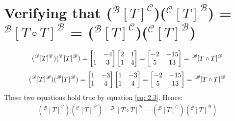 \documentclass[reqno,a4paper,12pt]{amsart}
\newcommand{\C}{\mathscr{C}}
\newcommand{\B}{\mathscr{B}}
\numberwithin{equation}{section}
\begin{document}
  \section{Verifying that ($^\B[T]^\C$)($^\C[T]^\B$) = $^\B[T \circ T]^\B$ = ($^\B[T]^\C$)($^\C[T]^\B$)}
  \begin{align}
  (^\B[T]^\C)(^\C[T]^\B) 
  =
    \begin{bmatrix}
      1 & -4 \\
      1 & 3
    \end{bmatrix}
    \begin{bmatrix}
      2 & 1 \\
      1 & 4
    \end{bmatrix}
    =
    \begin{bmatrix}
      -2 & -15 \\
      5 & 13
    \end{bmatrix}
    =
    \hspace{0.05cm}^\B[T \circ T]^\B \label{eq:3.1}
  \end{align} 
\begin{align}
(^\B[T]^\B)(^\B[T]^\B) 
  =
    \begin{bmatrix}
      1 & -3 \\
      1 & 4
    \end{bmatrix}
    \begin{bmatrix}
      1 & -3 \\
      1 & 4
    \end{bmatrix}
    =
    \begin{bmatrix}
      -2 & -15 \\
      5 & 13
    \end{bmatrix}
    =
    \hspace{0.05cm}^\B[T \circ T]^\B \label{eq:3.1}
  \end{align} 
These two equations hold true by equation \eqref{eq: 2.3}. Hence:\\
\begin{align}
(^\B[T]^\C)(^\C[T]^\B) = ^\B[T \circ T]^\B = (^\B[T]^\C)(^\C[T]^\B)
\end{align}
  
\end{document}
